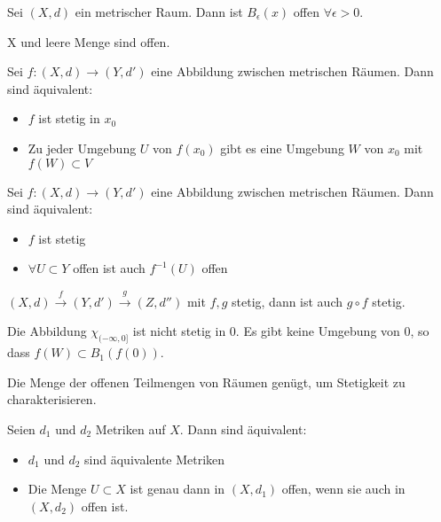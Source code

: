 \documentclass{skript}
\begin{document}
\begin{lem}
    Sei $(X, d)$ ein metrischer Raum. Dann ist $B_\epsilon(x)$ offen
    $\forall \epsilon > 0$.
\end{lem}

\begin{lem}
    X und leere Menge sind offen.
\end{lem}

\begin{stz}
    Sei $f: (X, d) \to (Y, d')$ eine Abbildung zwischen metrischen Räumen. Dann sind
    äquivalent:
   \begin{itemize}
        \item $f$ ist stetig in $x_0$
        \item Zu jeder Umgebung $U$ von $f(x_0)$ gibt es eine Umgebung $W$ von $x_0$
              mit $f(W)\subset V$
    \end{itemize}
\end{stz}

\begin{stz}
    Sei $f: (X, d) \to (Y, d')$ eine Abbildung zwischen metrischen Räumen. Dann sind
    äquivalent:
    \begin{itemize}
        \item $f$ ist stetig
        \item $\forall U \subset Y$ offen ist auch $f^{-1}(U)$ offen
    \end{itemize}
\end{stz}

\begin{krl}
    $(X,d) \overset{f}{\to} (Y,d') \overset{g}{\to} (Z, d'')$ mit $f,g$ stetig, dann
    ist auch $g \circ f$ stetig.
\end{krl}

\begin{bsp}
    Die Abbildung $\chi_{(-\infty,0]}$ ist nicht stetig in 0. Es gibt keine Umgebung
    von 0, so dass $f(W) \subset B_1(f(0))$.
\end{bsp}

\begin{bem}
    Die Menge der offenen Teilmengen von Räumen genügt, um Stetigkeit zu
    charakterisieren.
\end{bem}

\begin{stz}
    Seien $d_1$ und $d_2$ Metriken auf $X$. Dann sind äquivalent:
    \begin{itemize}
        \item $d_1$ und $d_2$ sind äquivalente Metriken
        \item Die Menge $U \subset X$ ist genau dann in $(X, d_1)$ offen, wenn sie
              auch in $(X, d_2)$ offen ist.
    \end{itemize}
\end{stz}
\end{document}
